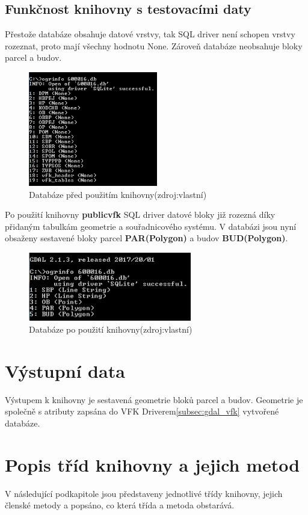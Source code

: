 \subsection{Funkčnost knihovny s testovacími daty}
Přestože databáze obsahuje datové vrstvy, tak SQL driver není schopen
vrstvy rozeznat, proto mají všechny hodnotu None. Zároveň databáze
neobsahuje bloky parcel a budov.
\begin{figure}[H]
	 \centering
      \includegraphics[height=5cm]{./pictures/funkcnost_knihovny_pred.png}
      \caption{Databáze před použitím knihovny(zdroj:vlastní)}
      \label{fig:funkcnost_pred}
\end{figure}
Po použití knihovny \textbf{publicvfk} SQL driver datové bloky již
rozezná díky přidaným tabulkám geometrie a souřadnicového systému. V
databázi jsou nyní obsaženy sestavené bloky parcel
\textbf{PAR(Polygon)} a budov \textbf{BUD(Polygon)}.
\begin{figure}[H]
	 \centering
     \includegraphics[height=3cm]{./pictures/funkcnost_knihovny_po.png}
     \caption{Databáze po použití knihovny(zdroj:vlastní)}
     \label{fig:funkcnost_po}
\end{figure}  
  
\section{Výstupní data}
Výstupem k knihovny je sestavená geometrie bloků parcel a
budov. Geometrie je společně s atributy zapsána do VFK
Driverem\ref{subsec:gdal_vfk} vytvořené databáze.

\section{Popis tříd knihovny a jejich metod}
\label{sec:popis_trid}
V následující podkapitole jsou představeny jednotlivé třídy knihovny,
jejich členské metody a popsáno, co která třída a metoda obstarává.

